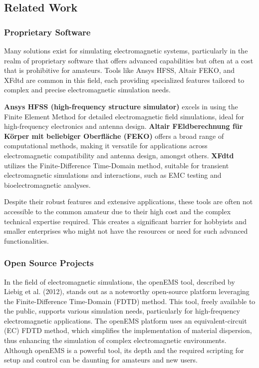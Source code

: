 \documentclass[11pt, a4paper, titlepage]{article}
\begin{document}
\subsection{Related Work}
\subsubsection{Proprietary Software}
Many solutions exist for simulating electromagnetic systems, particularly in the realm of proprietary software that offers advanced capabilities but often at a cost that is prohibitive for amateurs. Tools like Ansys HFSS, Altair FEKO, and XFdtd are common in this field, each providing specialized features tailored to complex and precise electromagnetic simulation needs.

\textbf{Ansys HFSS (high-frequency structure simulator)} excels in using the Finite Element Method for detailed electromagnetic field simulations, ideal for high-frequency electronics and antenna design. \textbf{Altair FEldberechnung für Körper mit beliebiger Oberﬂäche (FEKO)} offers a broad range of computational methods, making it versatile for applications across electromagnetic compatibility and antenna design, amongst others. \textbf{XFdtd} utilizes the Finite-Difference Time-Domain method, suitable for transient electromagnetic simulations and interactions, such as EMC testing and bioelectromagnetic analyses.

Despite their robust features and extensive applications, these tools are often not accessible to the common amateur due to their high cost and the complex technical expertise required. This creates a significant barrier for hobbyists and smaller enterprises who might not have the resources or need for such advanced functionalities.
\newpage

\subsubsection{Open Source Projects}
In the field of electromagnetic simulations, the openEMS tool, described by Liebig et al. (2012), stands out as a noteworthy open-source platform leveraging the Finite-Difference Time-Domain (FDTD) method. This tool, freely available to the public, supports various simulation needs, particularly for high-frequency electromagnetic applications. The openEMS platform uses an equivalent-circuit (EC) FDTD method, which simplifies the implementation of material dispersion, thus enhancing the simulation of complex electromagnetic environments. Although openEMS is a powerful tool, its depth and the required scripting for setup and control can be daunting for amateurs and new users.
\end{document}

